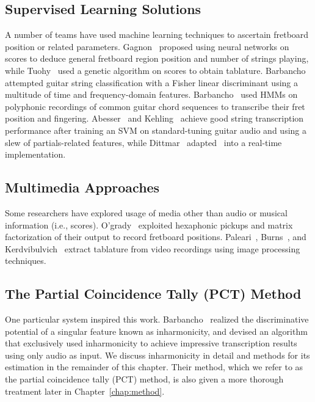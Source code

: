 \documentclass[12pt]{cmuthesis}
\begin{document}
\subsection{Supervised Learning Solutions}
A number of teams have used machine learning techniques to ascertain fretboard position or related parameters. Gagnon~\cite{gagnon2003} proposed using neural networks on scores to deduce general fretboard region position and number of strings playing, while Tuohy~\cite{tuohy2006} used a genetic algorithm on scores to obtain tablature. Barbancho~\cite{barbancho2009} attempted guitar string classification with a Fisher linear discriminant using a multitude of time and frequency-domain features. Barbancho~\cite{barbanchoa2012} used HMMs on polyphonic recordings of common guitar chord sequences to transcribe their fret position and fingering. Abesser~\cite{abesser2012} and Kehling~\cite{kehling2014} achieve good string transcription performance after training an SVM on standard-tuning guitar audio and using a slew of partials-related features, while Dittmar~\cite{dittmar2013} adapted~\cite{abesser2012} into a real-time implementation.

\subsection{Multimedia Approaches}
Some researchers have explored usage of media other than audio or musical information (i.e., scores). O'grady~\cite{ogrady2009} exploited hexaphonic pickups and matrix factorization of their output to record fretboard positions. Paleari~\cite{paleari2008}, Burns~\cite{burns2006}, and Kerdvibulvich~\cite{kerd2007} extract tablature from video recordings using image processing techniques.

\subsection{The Partial Coincidence Tally (PCT) Method}
One particular system inspired this work. Barbancho~\cite{barbanchoi2012} realized the discriminative potential of a singular feature known as inharmonicity, and devised an algorithm that exclusively used inharmonicity to achieve impressive transcription results using only audio as input. We discuss inharmonicity in detail and methods for its estimation in the remainder of this chapter. Their method, which we refer to as the partial coincidence tally (PCT) method, is also given a more thorough treatment later in Chapter~\ref{chap:method}.
\end{document}
